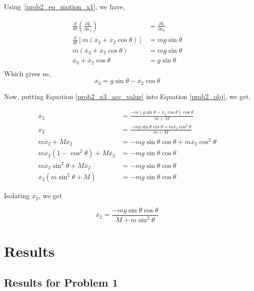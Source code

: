 \documentclass[conference]{IEEEtran}
\begin{document}
Using~\ref{prob2_eq_motion_x1}, we have,

\begin{align*}
    \frac{d}{dt} \left(\frac{\partial L}{\partial \dot{x_3}}\right) &= \frac{\partial L}{ \partial x_3}\\
    \frac{d}{dt} \left[m(\dot{x_3} + \dot{x_2}\cos\theta)\right] &= mg\sin\theta\\
    m (\ddot{x_3} + \ddot{x_2}\cos\theta) &= mg\sin\theta\\
    \ddot{x_3} + \ddot{x_2}\cos\theta &= g\sin\theta\\
\end{align*}
Which gives us,
\begin{equation}\label{prob2_x3_acc_value}
    \ddot{x_3} = g\sin\theta - \ddot{x_2}\cos\theta
\end{equation}

Now, putting Equation \ref{prob2_x3_acc_value} into Equation \ref{prob2_obj}, we get,

\begin{align*}
    \ddot{x_2} &= \frac{- m(g\sin\theta - \ddot{x_2}\cos\theta)\cos\theta}{m + M}\\
    \ddot{x_2} &= \frac{-mg\sin\theta\cos\theta + m\ddot{x_2}\cos^2\theta}{m+M}\\
    m \ddot{x_2} + M \ddot{x_2} &= -mg\sin\theta\cos\theta + m\ddot{x_2}\cos^2\theta\\
    m \ddot{x_2}(1 - \cos^2\theta) + M \ddot{x_2} &= -mg\sin\theta\cos\theta\\
    m \ddot{x_2}\sin^2\theta + M \ddot{x_2} &= -mg\sin\theta\cos\theta\\
    \ddot{x_2}(m \sin^2\theta + M) &= -mg\sin\theta\cos\theta
\end{align*}

Isolating $\ddot{x_2}$, we get

\begin{equation}\label{prob2_obj_isolated}
    \ddot{x_2} = \frac{-mg\sin\theta\cos\theta}{M + m \sin^2\theta}
\end{equation}

\vspace{0.2in}

\section{Results}

\subsection{Results for Problem 1}
\end{document}

